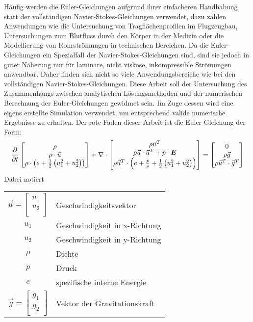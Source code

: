 Häufig werden die Euler-Gleichungen aufgrund ihrer einfacheren Handhabung statt der vollständigen Navier-Stokes-Gleichungen verwendet, dazu zählen Anwendungen wie die Untersuchung von Tragflächenprofilen im Flugzeugbau, Untersuchungen zum Blutfluss durch den Körper in der Medizin oder die Modellierung von Rohrströmungen in technischen Bereichen. Da die Euler-Gleichungen ein Spezialfall der Navier-Stokes-Gleichungen sind, sind sie jedoch in guter Näherung nur für laminare, nicht viskose, inkompressible Strömungen anwendbar. Daher finden sich nicht so viele Anwendungsbereiche wie bei den vollständigen Navier-Stokes-Gleichungen. Diese Arbeit soll der Untersuchung des Zusammenhangs zwischen analytischen Lösungsmethoden und der numerischen Berechnung der Euler-Gleichungen gewidmet sein. Im Zuge dessen wird eine eigens erstellte Simulation verwendet, um entsprechend valide numerische Ergebnisse zu erhalten. Der rote Faden dieser Arbeit ist die Euler-Gleichung der Form:
\begin{align}
\label{eq:euler}
    \frac{\partial }{\partial t}
    \begin{bmatrix}
        \rho \\
        \rho \cdot \vec{u} \\
        \rho \cdot \left( e + \frac{1}{2} \left(u_1^2 + u_2^2\right)\right)
    \end{bmatrix}
    + \nabla \cdot
    \begin{bmatrix}
        \rho\vec{u}^T \\
        \rho \vec{u}\cdot \vec{u}^T + p\cdot \boldsymbol{E}\\
        \rho \vec{u}^T \cdot \left( e + \frac{p}{\rho} + \frac{1}{2} \left(u_1^2 + u_2^2 \right)\right) \\
    \end{bmatrix}
    =
    \begin{bmatrix}
        0 \\
        \rho \vec{g} \\
        \rho \vec{u}^T \cdot \vec{g}^T
    \end{bmatrix}
\end{align}
Dabei notiert
\begin{table}[H]
\begin{tabular}{c l}
    $\vec{u} = \begin{bmatrix}
        u_1 \\
        u_2 \\
    \end{bmatrix}$ & Geschwindigkeitsvektor \\
    $u_1$ & Geschwindigkeit in x-Richtung \\
    $u_2$ & Geschwindigkeit in y-Richtung \\
    $\rho$ & Dichte \\
    $p$ & Druck \\
    $e$ & spezifische interne Energie \\
    $\vec{g} = 
    \begin{bmatrix}
        g_1 \\
        g_2 \\
    \end{bmatrix}$ & Vektor der Gravitationskraft
\end{tabular}
\end{table}
